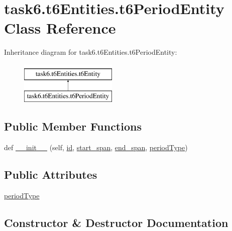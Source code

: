 \hypertarget{classtask6_1_1t6Entities_1_1t6PeriodEntity}{}\section{task6.\+t6\+Entities.\+t6\+Period\+Entity Class Reference}
\label{classtask6_1_1t6Entities_1_1t6PeriodEntity}
Inheritance diagram for task6.\+t6\+Entities.\+t6\+Period\+Entity\+:\begin{figure}[H]
\begin{center}
\leavevmode
\includegraphics[height=2.000000cm]{classtask6_1_1t6Entities_1_1t6PeriodEntity}
\end{center}
\end{figure}
\subsection*{Public Member Functions}
\begin{DoxyCompactItemize}
\item 
def \hyperlink{classtask6_1_1t6Entities_1_1t6PeriodEntity_a447a8538b93c2116de30aa47eccfcbec}{\+\_\+\+\_\+init\+\_\+\+\_\+} (self, \hyperlink{classtask6_1_1t6Entities_1_1t6Entity_a96b2e7fb553c920ab2db6f6deb31e3b4}{id}, \hyperlink{classtask6_1_1t6Entities_1_1t6Entity_a8221c36d2995a24200cdfbd74cc9233c}{start\+\_\+span}, \hyperlink{classtask6_1_1t6Entities_1_1t6Entity_a597d42bb02fc9f42277098f0ce21917c}{end\+\_\+span}, \hyperlink{classtask6_1_1t6Entities_1_1t6PeriodEntity_ae2f4d463fe5601083ce5ce3070690f1d}{period\+Type})
\end{DoxyCompactItemize}
\subsection*{Public Attributes}
\begin{DoxyCompactItemize}
\item 
\hyperlink{classtask6_1_1t6Entities_1_1t6PeriodEntity_ae2f4d463fe5601083ce5ce3070690f1d}{period\+Type}
\end{DoxyCompactItemize}


\subsection{Constructor \& Destructor Documentation}
\mbox{\label{classtask6_1_1t6Entities_1_1t6PeriodEntity_a447a8538b93c2116de30aa47eccfcbec}} 
